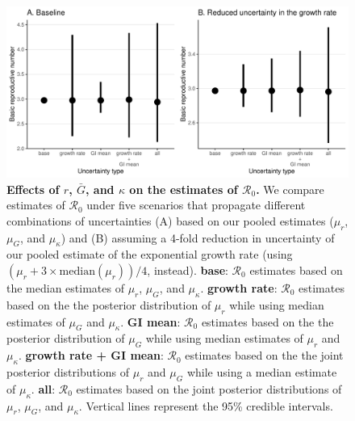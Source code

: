 \documentclass[12pt]{article}
\newcommand{\Ro}{\ensuremath{{\mathcal R}_{0}}\xspace}
\begin{document}
\begin{figure}[!ht]
\includegraphics[width=\textwidth]{figure2.pdf}
\caption{
  \textbf{Effects of $r$, $\bar G$, and $\kappa$ on the estimates of \Ro.}
We compare estimates of \Ro under five scenarios that propagate different combinations of uncertainties (A) based on our pooled estimates ($\mu_r$, $\mu_G$, and $\mu_\kappa$) and (B) assuming a 4-fold reduction in uncertainty of our pooled estimate of the exponential growth rate (using $(\mu_r + 3\times\mathrm{median}(\mu_r))/4$, instead).
\textbf{base}: \Ro estimates based on the median estimates of $\mu_r$, $\mu_G$, and $\mu_\kappa$.
\textbf{growth rate}: \Ro estimates based on the the posterior distribution of $\mu_r$ while using median estimates of $\mu_G$ and $\mu_\kappa$.
\textbf{GI mean}: \Ro estimates based on the the posterior distribution of $\mu_G$ while using median estimates of $\mu_r$ and $\mu_\kappa$.
\textbf{growth rate + GI mean}: \Ro estimates based on the the joint posterior distributions of $\mu_r$ and $\mu_G$ while using a median estimate of $\mu_\kappa$.
\textbf{all}: \Ro estimates based on the joint posterior distributions of  $\mu_r$, $\mu_G$, and $\mu_\kappa$.
Vertical lines represent the 95\% credible intervals.
}
\label{fig:eff}
\end{figure}
\end{document}
